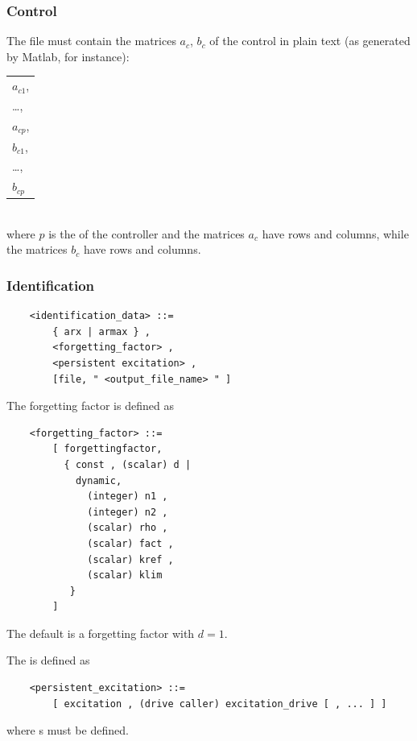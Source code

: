   \subsubsection{Control}
  The file  must contain the matrices
  $ a_c $, $ b_c $ of the control in plain text (as generated by Matlab, for
  instance): \\
  \begin{tabular}{l}
    $ a_{c1} $, \\
    \ldots,     \\
    $ a_{cp} $, \\
    $ b_{c1} $, \\
    \ldots,     \\
    $ b_{cp} $  \\
  \end{tabular} \\
  where $ p $ is the  of the controller and the matrices $ a_c $
  have  rows and  columns, while the
  matrices $ b_c $ have  rows and  columns.

\subsubsection{Identification}
\begin{verbatim}
    <identification_data> ::=
        { arx | armax } ,
        <forgetting_factor> ,
        <persistent excitation> ,
        [file, " <output_file_name> " ]
\end{verbatim}
The forgetting factor is defined as
\begin{verbatim}
    <forgetting_factor> ::=
        [ forgettingfactor,
          { const , (scalar) d |
            dynamic,
              (integer) n1 ,
              (integer) n2 ,
              (scalar) rho ,
              (scalar) fact ,
              (scalar) kref ,
              (scalar) klim
           }
        ]    
\end{verbatim}
The default is a  forgetting factor with $d=1$.

\noindent
The  is defined as
\begin{verbatim}
    <persistent_excitation> ::=
        [ excitation , (drive caller) excitation_drive [ , ... ] ]
\end{verbatim}
where  s must be defined.

